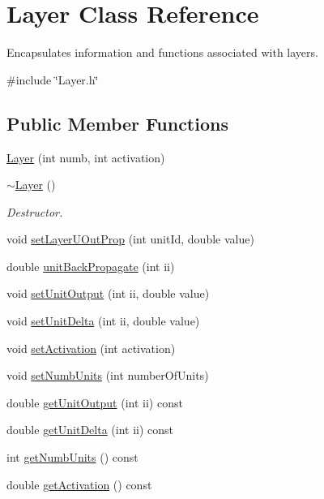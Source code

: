\hypertarget{classLayer}{}\section{Layer Class Reference}
\label{classLayer}


Encapsulates information and functions associated with layers.  




{\ttfamily \#include \char`\"{}Layer.\+h\char`\"{}}

\subsection*{Public Member Functions}
\begin{DoxyCompactItemize}
\item 
\hyperlink{classLayer_a3bfd0aa7e6ecd9c017d271e316ca632d}{Layer} (int numb, int activation)
\item 
\hyperlink{classLayer_a1b1ba4804451dfe6cc357194e42762ae}{$\sim$\+Layer} ()
\begin{DoxyCompactList}\small\item\em Destructor. \end{DoxyCompactList}\item 
void \hyperlink{classLayer_ad557f21443c82b6f9527881b4040a251}{set\+Layer\+U\+Out\+Prop} (int unit\+Id, double value)
\item 
double \hyperlink{classLayer_aaf6502d5971225e2c2ddc45e4f7fc7ff}{unit\+Back\+Propagate} (int ii)
\item 
void \hyperlink{classLayer_a55b20e4d3a98a3ec660d8777c7fae170}{set\+Unit\+Output} (int ii, double value)
\item 
void \hyperlink{classLayer_af9116e59830024fb9862577f2043706a}{set\+Unit\+Delta} (int ii, double value)
\item 
void \hyperlink{classLayer_a530d7d38d135f5ebe4183c587c0343ab}{set\+Activation} (int activation)
\item 
void \hyperlink{classLayer_a15e429b9b73a7b561fbb1235ccb2cf65}{set\+Numb\+Units} (int number\+Of\+Units)
\item 
double \hyperlink{classLayer_a0ff31aa9649a66a964320e5811c4886e}{get\+Unit\+Output} (int ii) const 
\item 
double \hyperlink{classLayer_aebf994c02ba2069edddc31ea286cafb5}{get\+Unit\+Delta} (int ii) const 
\item 
int \hyperlink{classLayer_a317562411932be9533c13d20c2890596}{get\+Numb\+Units} () const 
\item 
double \hyperlink{classLayer_a586ea1cdda469415557b195dafa65afa}{get\+Activation} () const 
\end{DoxyCompactItemize}
